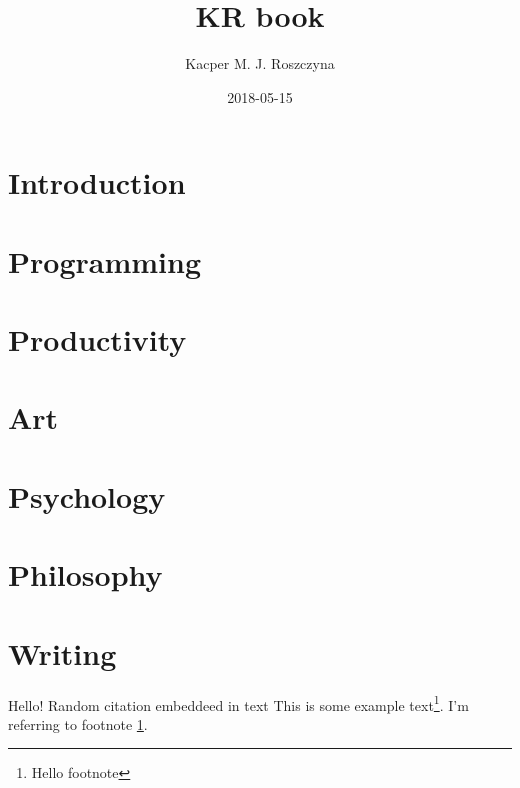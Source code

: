 \documentclass{article}
\title{KR book}
\date{2018-05-15}
\author{Kacper M. J. Roszczyna}
\begin{document}

\maketitle
\newpage


\doublespacing
\tableofcontents
\newpage
\singlespacing

\section{Introduction}


\section{Programming}


\section{Productivity}

\section{Art}

\section{Psychology}

\section{Philosophy}

\section{Writing}

Hello!
Random citation \cite{DUMMY:1} embeddeed in text
This is some example text\footnote{\label{myfootnote}Hello footnote}.
I'm referring to footnote \ref{myfootnote}.

\begin{appendix}
  \listoffigures
  \listoftables
\end{appendix}



\end{document}
